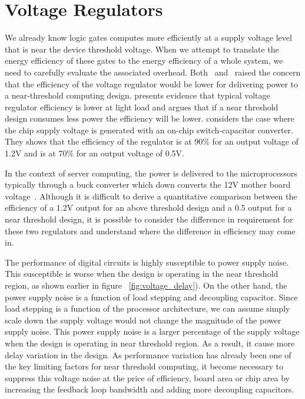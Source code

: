 \section{Voltage Regulators}

We already know logic gates computes more efficiently at a supply voltage level
that is near the device threshold voltage. When we attempt to translate the
energy efficiency of these gates to the energy efficiency of a whole system, we
need to carefully evaluate the associated overhead.
Both~\cite{ISLPED:2011}
and~\cite{Pitfall:2010} raised the concern that the efficiency
of the voltage regulator would be lower for delivering power to a near-threshold
computing design. \cite{ISLPED:2011} presents evidence that
typical voltage regulator efficiency is lower at light load and argues that if a
near threshold design consumes less power the efficiency will be lower.
\cite{Pitfall:2010} considers the case where the chip supply
voltage is generated with an on-chip switch-capacitor converter. They shows that
the efficiency of the regulator is at 90\% for an output voltage of 1.2V and is
at 70\% for an output voltage of 0.5V.

In the context of server computing, the power is delivered to the
microprocessors typically through a buck converter which down converts the 12V
mother board voltage~\cite{Server:2006}. Although it is
difficult to derive a quantitative comparison between the efficiency of a 1.2V
output for an above threshold design and a 0.5 output for a near threshold
design, it is possible to consider the difference in requirement for these two
regulators and understand where the difference in efficiency may come in. 

The performance of digital circuits is highly susceptible to power supply noise.
This susceptible is worse when the design is operating in the near threshold
region, as shown earlier in figure ~\ref{fig:voltage_delay}). On the other hand,
the power supply noise is a function of load stepping and decoupling capacitor.
Since load stepping is a function of the processor architecture, we can assume
simply scale down the supply voltage would not change the magnitude of the power
supply noise. This power supply noise is a larger percentage of the supply
voltage when the design is operating in near threshold region. As a result, it
cause more delay variation in the design. As performance variation has already
been one of the key limiting factors for near threshold computing, it become
necessary to suppress this voltage noise at the price of efficiency, board area
or chip area by increasing the feedback loop bandwidth and adding more
decoupling capacitors.

